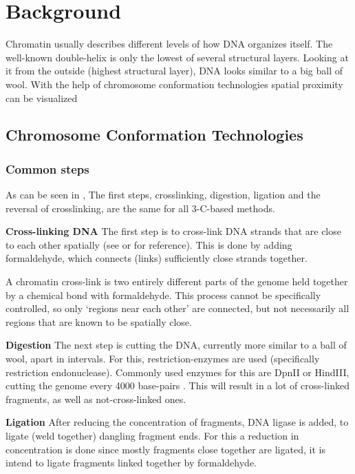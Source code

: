\chapter{Background}\label{chap:background}


Chromatin usually describes different levels of how DNA organizes itself. The
well-known double-helix is only the lowest of several structural layers.
Looking at it from the outside (highest structural layer), DNA looks similar to
a big ball of wool. With the help of chromosome conformation technologies
spatial proximity can be visualized




\section{Chromosome Conformation Technologies}\label{sec:cct}

\subsection{Common steps}\label{sec:common}

As can be seen in , The first steps, crosslinking, digestion,
ligation and the reversal of crosslinking, are the same for all 3-C-based methods.


\textbf{Cross-linking DNA}\label{sec:crosslinking}
The first step is to cross-link DNA strands that are close to each other
spatially (see  or  for reference). This is done by adding
formaldehyde, which connects (links) sufficiently close strands together.

A chromatin cross-link is two entirely different parts of the genome held
together by a chemical bond with formaldehyde. This process cannot be
specifically controlled, so only `regions near each other' are connected, but
not necessarily all regions that are known to be spatially close.


\textbf{Digestion}\label{sec:digestion}
The next step is cutting the DNA, currently more similar to a ball of wool,
apart in intervals. For this, restriction-enzymes are used (specifically
restriction endonuclease). Commonly used enzymes for this are DpnII or HindIII,
cutting the genome every 4000 base-pairs \cite{lieberman2009comprehensive}.
This will result in a lot of cross-linked fragments, as well as
not-cross-linked ones.


\textbf{Ligation}\label{sec:ligation}
After reducing the concentration of fragments, DNA ligase is added, to ligate
(weld together) dangling fragment ends. For this a reduction in concentration
is done since mostly fragments close together are ligated, it is intend to
ligate fragments linked together by formaldehyde.

